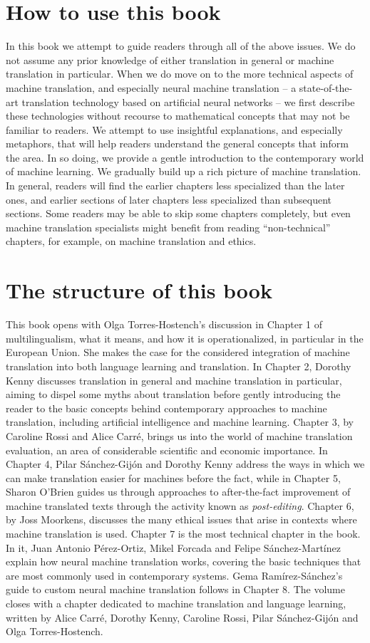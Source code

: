 \documentclass[output=paper]{langscibook}
\begin{document}
\section{How to use this book}
In this book we attempt to guide readers through all of the above issues. We do not assume any prior knowledge of either translation in general or machine translation in particular. When we do move on to the more technical aspects of machine translation, and especially neural machine translation -- a state-of-the-art translation technology based on artificial neural networks -- we first describe these technologies without recourse to mathematical concepts that may not be familiar to readers. We attempt to use insightful explanations, and especially metaphors, that will help readers understand the general concepts that inform the area. In so doing, we provide a gentle introduction to the contemporary world of machine learning. We gradually build up a rich picture of machine translation. In general, readers will find the earlier chapters less specialized than the later ones, and earlier sections of later chapters less specialized than subsequent sections. Some readers may be able to skip some chapters completely, but even machine translation specialists might benefit from reading “non-technical” chapters, for example, on machine translation and ethics.

\section{The structure of this book}
This book opens with Olga Torres-Hostench's discussion in Chapter 1 of multilingualism, what it means, and how it is operationalized, in particular in the European Union. She makes the case for the considered integration of machine translation into both language learning and translation. In Chapter 2, Dorothy Kenny discusses translation in general and machine translation in particular, aiming to dispel some myths about translation before gently introducing the reader to the basic concepts behind contemporary approaches to machine translation, including artificial intelligence and machine learning. Chapter 3, by Caroline Rossi and Alice Carré, brings us into the world of machine translation evaluation, an area of considerable scientific and economic importance. In Chapter 4, Pilar Sánchez-Gijón and Dorothy Kenny address the ways in which we can make translation easier for machines before the fact, while in Chapter 5, Sharon O'Brien guides us through approaches to after-the-fact improvement of machine translated texts through the activity known as \textit{post-editing}. Chapter 6, by Joss Moorkens, discusses the many ethical issues that arise in contexts where machine translation is used. Chapter 7 is the most technical chapter in the book. In it, Juan Antonio Pérez-Ortiz, Mikel Forcada and Felipe Sánchez-Martínez explain how neural machine translation works, covering the basic techniques that are most commonly used in contemporary systems. Gema Ramírez-Sánchez's guide to custom neural machine translation follows in Chapter 8. The volume closes with a chapter dedicated to machine translation and language learning, written by Alice Carré, Dorothy Kenny, Caroline Rossi, Pilar Sánchez-Gijón and Olga Torres-Hostench.
\end{document}
